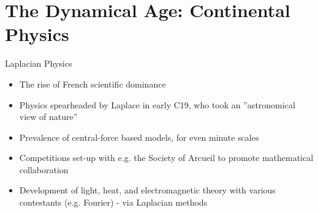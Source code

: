 \documentclass{beamer}
\begin{document}
\section{The Dynamical Age: Continental Physics}%
\begin{frame}{Laplacian Physics}
\begin{itemize}
	\item The rise of French scientific dominance
	\item Physics spearheaded by Laplace in early C19, who took an ''astronomical view of nature''{ \autocite{merz}}
	\item Prevalence of central-force based models, for even minute scales{ \autocite{foxl}}
	\item Competitions set-up with e.g. the Society of Arcueil to promote mathematical collaboration
	\item Development of light, heat, and electromagnetic theory with various contestants (e.g. Fourier) - via Laplacian methods
\end{itemize}
\end{frame}
\end{document}
